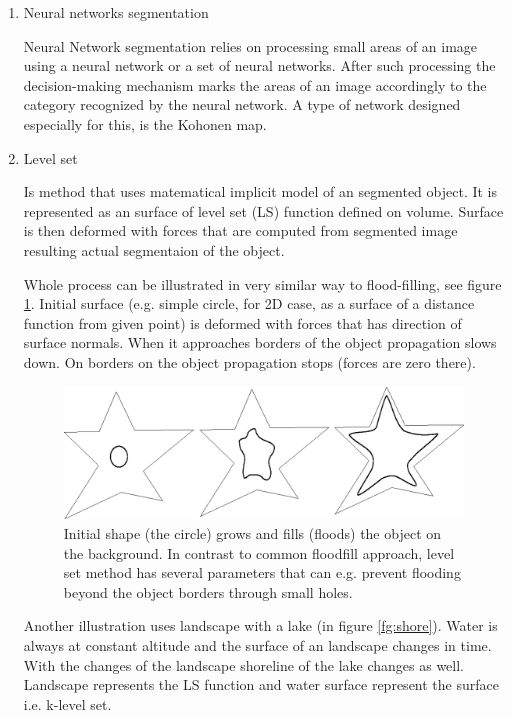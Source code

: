 \begin{enumerate}
  \item  Neural networks segmentation

  Neural Network segmentation relies on processing small areas of an image using a neural network or a set of neural networks. After such processing the decision-making mechanism marks the areas of an image accordingly to the category recognized by the neural network. A type of network designed especially for this, is the Kohonen map.

  \item Level set

Is method that uses matematical implicit model of an segmented object. It is represented as an surface of level set (LS) function defined on volume. Surface is then deformed with forces that are computed from segmented image resulting actual segmentaion of the object.

Whole process can be illustrated in very similar way to flood-filling, see
figure \ref{fg:flooding}.
Initial surface (e.g. simple circle, for 2D case, as a surface of a distance
function from given point) is deformed with forces that has direction of surface
normals. When it approaches borders of the object propagation slows down. On
borders on the object propagation stops (forces are zero there).

\begin{figure}
    \centering
    \includegraphics[width=12cm]{data/flooding}
    \caption[Flooding an object]{Initial shape (the circle) grows and fills (floods) the object on the background. In contrast to common floodfill approach, level set method has several parameters that can e.g. prevent flooding beyond the object borders through small holes.}
    \label{fg:flooding}
\end{figure}

Another illustration uses landscape with a lake (in figure \ref{fg:shore}).
Water is always at constant altitude and the surface of an landscape changes in
time. With the changes of the landscape shoreline of the lake changes as well.
Landscape represents the LS function and water surface represent the surface
i.e. k-level set.


\end{enumerate}
